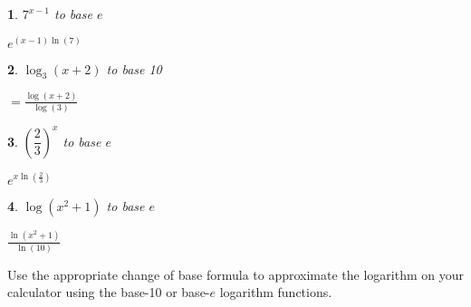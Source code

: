 \documentclass{amsbook}
\newtheorem{exc}{}
\newenvironment{ex}{\begin{exc}\normalfont}{\end{exc}}
\numberwithin{section}{chapter}
\numberwithin{equation}{chapter}
\begin{document}
\begin{multicols}{2}
\begin{ex}
	$7^{x - 1}$ to base $e$ 
	\begin{sol}
		$e^{(x - 1)\ln(7)}$
	\end{sol}
\end{ex}

\begin{ex}
	$\log_{3}(x + 2)$ to base 10
	\begin{sol}
		$= \frac{\log(x + 2)}{\log(3)}$
	\end{sol}
\end{ex}

\begin{ex}
	$\left(\dfrac{2}{3}\right)^{x}$ to base $e$
	\begin{sol}
		$e^{x\ln(\frac{2}{3})}$
	\end{sol}
\end{ex}


\begin{ex}
	$\log(x^{2} + 1)$ to base $e$ 
	\begin{sol}
		$ \frac{\ln(x^{2} + 1)}{\ln(10)}$
	\end{sol}
\end{ex}

\end{multicols}


Use the appropriate change of base formula to approximate the logarithm on your calculator using the base-10 or base-$e$ logarithm functions.
\end{document}
